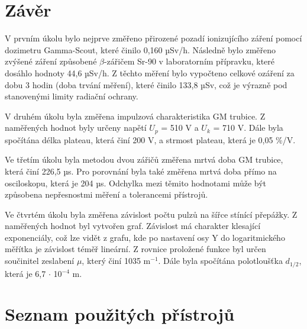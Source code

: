 \documentclass{protokol}
\begin{document}
\section{Závěr}

        V prvním úkolu bylo nejprve změřeno přirozené pozadí ionizujícího záření pomocí dozimetru Gamma-Scout, které činilo 0,160 µSv/h. Následně bylo změřeno zvýšené záření způsobené $\beta$-zářičem Sr-90 v laboratorním přípravku, které dosáhlo hodnoty 44,6 µSv/h. Z těchto měření bylo vypočteno celkové ozáření za dobu 3 hodin (doba trvání měření), které činilo 133,8 µSv, což je výrazně pod stanovenými limity radiační ochrany.
        
        V druhém úkolu byla změřena impulzová charakteristika GM trubice. Z naměřených hodnot byly určeny napětí $U_p$ = 510 V a $U_k$ = 710 V. Dále byla spočítána délka plateau, která činí 200 V, a strmost plateau, která je 0,05 \%/V.

        Ve třetím úkolu byla metodou dvou zářičů změřena mrtvá doba GM trubice, která činí 226,5 µs. Pro porovnání byla také změřena mrtvá doba přímo na osciloskopu, která je 204 µs. Odchylka mezi těmito hodnotami může být způsobena nepřesnostmi měření a tolerancemi přístrojů.

        Ve čtvrtém úkolu byla změřena závislost počtu pulzů na šířce stínící přepážky. Z naměřených hodnot byl vytvořen graf. Závislost má charakter klesající exponenciály, což lze vidět z grafu, kde po nastavení osy Y do logaritmického měřítka je závislost téměř lineární. Z rovnice proložené funkce byl určen součinitel zeslabení $\mu$, který činí 1035 m$^{-1}$. Dále byla spočítána polotloušťka $d_{1/2}$, která je 6,7 $\cdot$ 10$^{-4}$ m.

    \cite{navod}
    \cite{vyhlaska}

\pagebreak


\section{Seznam použitých přístrojů}

\pagebreak


\end{document}
